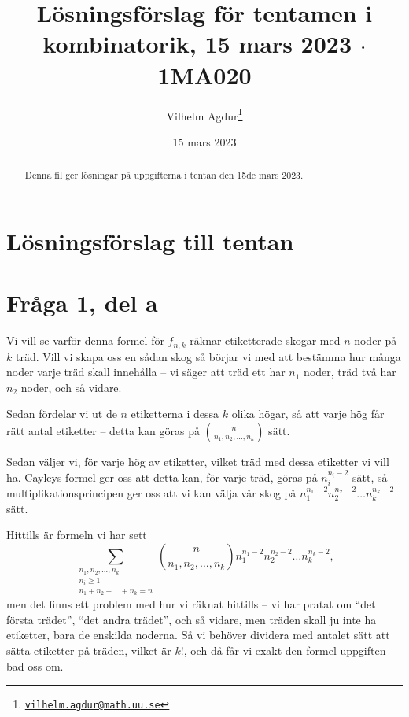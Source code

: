 \documentclass[nobib]{tufte-handout}
\title{Lösningsförslag för tentamen i kombinatorik, 15 mars 2023 $\cdot$ 1MA020}
\author[Vilhelm Agdur]{Vilhelm Agdur\thanks{\href{mailto:vilhelm.agdur@math.uu.se}{\nolinkurl{vilhelm.agdur@math.uu.se}}}}
\date{15 mars 2023}
\begin{document}

\maketitle%

\begin{abstract}
\noindent

Denna fil ger lösningar på uppgifterna i tentan den 15de mars 2023.

\end{abstract}

\section{Lösningsförslag till tentan}

\section{Fråga 1, del a}

Vi vill se varför denna formel för $f_{n,k}$ räknar etiketterade skogar med $n$ noder på $k$ träd. Vill vi skapa oss en sådan skog så börjar vi med att bestämma hur många noder varje träd skall innehålla -- vi säger att träd ett har $n_1$ noder, träd två har $n_2$ noder, och så vidare.

Sedan fördelar vi ut de $n$ etiketterna i dessa $k$ olika högar, så att varje hög får rätt antal etiketter -- detta kan göras på $\binom{n}{n_1, n_2, \ldots, n_k}$ sätt.

Sedan väljer vi, för varje hög av etiketter, vilket träd med dessa etiketter vi vill ha. Cayleys formel ger oss att detta kan, för varje träd, göras på $n_i^{n_i-2}$ sätt, så multiplikationsprincipen ger oss att vi kan välja vår skog på $n_1^{n_1-2}n_2^{n_2-2}\ldots n_k^{n_k-2}$ sätt.

Hittills är formeln vi har sett
$$\sum_{\substack{n_1, n_2, \ldots, n_k\\ n_i \geq 1\\n_1 + n_2 + \ldots + n_k = n}} \binom{n}{n_1, n_2, \ldots, n_k}n_1^{n_1-2}n_2^{n_2-2}\ldots n_k^{n_k-2},$$
men det finns ett problem med hur vi räknat hittills -- vi har pratat om ``det första trädet'', ``det andra trädet'', och så vidare, men träden skall ju inte ha etiketter, bara de enskilda noderna. Så vi behöver dividera med antalet sätt att sätta etiketter på träden, vilket är $k!$, och då får vi exakt den formel uppgiften bad oss om.
\end{document}
